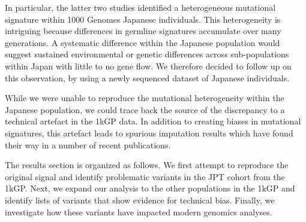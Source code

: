 \documentclass[custompaper]{MBE}%
\begin{document}
In particular, the latter two studies  identified a heterogeneous mutational signature within 1000 Genomes Japanese individuals.
This heterogeneity is intriguing because differences in germline signatures accumulate over many generations.
A systematic difference within the Japanese population would suggest sustained environmental or genetic differences across sub-populations within Japan with little to no gene flow.
We therefore decided to follow up on this observation, by using a newly sequenced dataset of Japanese individuals. 

While we were unable to reproduce the mutational heterogeneity within the Japanese population, we could trace back the source of the discrepancy to a technical artefact in the 1kGP data.
In addition to creating biases in mutational signatures, this artefact leads to spurious imputation results which have found their way in a number of recent publications.


The results section is organized as follows.
We first attempt to reproduce the original signal and identify problematic variants in the JPT cohort from the 1kGP. 
Next, we expand our analysis to the other populations in the 1kGP and identify lists of variants that show evidence for technical bias.
Finally, we investigate how these variants have impacted modern genomics analyses.  
  
\end{document}
